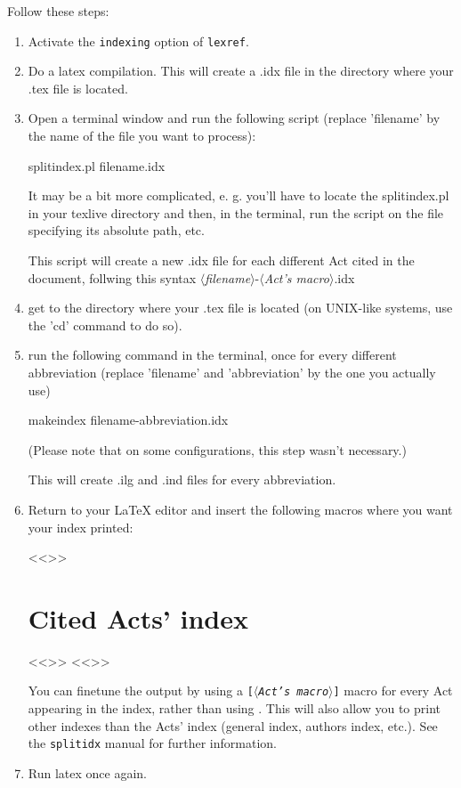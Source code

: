 \documentclass[a4paper]{ltxdockit}[2011/03/25]
\newcommand{\lexref}{\texttt{lexref}\xspace}
\newcommand{\oarg}[1]{\texttt{[#1]}}
\newcommand{\variable}[1]{$\langle$\textsl{#1}$\rangle$}
\begin{document}
Follow these steps:
\begin{enumerate}
\item Activate the \texttt{indexing} option of \lexref.
\item Do a latex compilation. This will create a .idx file in the directory where your .tex file is located.
\item Open a terminal window and run the following script (replace 'filename' by the name of the file you want to process):

\begin{ltxcode}
splitindex.pl filename.idx
\end{ltxcode}

It may be a bit more complicated, e. g. you'll have to locate the splitindex.pl in your texlive directory and then, in the terminal, run the script on the file specifying its absolute path, etc.

This script will create a new .idx file for each different Act cited in the document, follwing this syntax \variable{filename}-\variable{Act's macro}.idx

\item get to the directory where your .tex file is located (on UNIX-like systems, use the 'cd' command to do so).

\item run the following command in the terminal, once for every different abbreviation (replace 'filename' and 'abbreviation' by the one you actually use)

\begin{ltxcode}
makeindex filename-abbreviation.idx
\end{ltxcode}

(Please note that on some configurations, this step wasn't necessary.)

This will create .ilg and .ind files for every abbreviation.

\item Return to your \LaTeX{} editor and insert the following macros where you want your index printed:

\begin{ltxcode}
<<\pagebreak>>
\section*{Cited Acts' index}%
<<\twocolumn>>
<<\printindex*>>
\end{ltxcode}

You can finetune the output by using a \oarg{\variable{Act's macro}} macro for every Act appearing in the index, rather than using . This will also allow you to print other indexes than the Acts' index (general index, authors index, etc.). See the \texttt{splitidx} manual for further information.

\item Run latex once again.
\end{enumerate}
\end{document}
